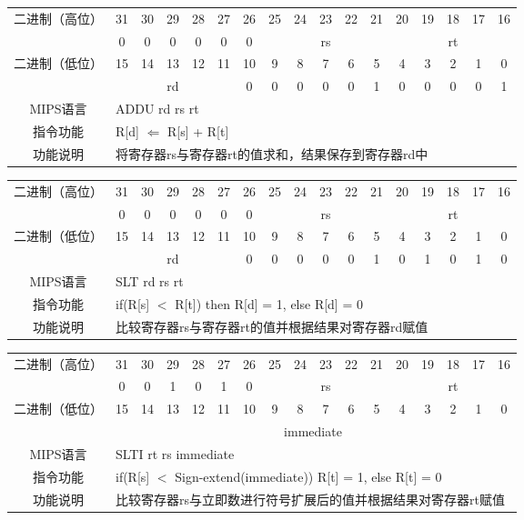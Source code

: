 \begin{table}

\begin{tabular}{|c|c|c|c|c|c|c|c|c|c|c|c|c|c|c|c|c|}
\hline
\multirow{2}{*}{二进制（高位）} &
31&30&29&28&27&26&25&24&23&22&21&20&19&18&17&16\\
\cline{2-17}
&0&0&0&0&0&0&
\multicolumn{5}{c|}{rs}&
\multicolumn{5}{c|}{rt}\\
\hline
\multirow{2}{*}{二进制（低位）} &
15&14&13&12&11&10&9&8&7&6&5&4&3&2&1&0\\
\cline{2-17}
&
\multicolumn{5}{c|}{rd}&
0&0&0&0&0&1&0&0&0&0&1\\
\hline
MIPS语言&
\multicolumn{16}{l|}{ADDU rd rs rt}\\
\hline
指令功能&
\multicolumn{16}{l|}{R[d] $\Leftarrow$ R[s] + R[t]}\\
\hline
功能说明&
\multicolumn{16}{l|}{将寄存器rs与寄存器rt的值求和，结果保存到寄存器rd中}\\
\hline
\end{tabular}
\end{table}
\begin{table}
\begin{tabular}{|c|c|c|c|c|c|c|c|c|c|c|c|c|c|c|c|c|}
\hline
\multirow{2}{*}{二进制（高位）} &
31&30&29&28&27&26&25&24&23&22&21&20&19&18&17&16\\
\cline{2-17}
&0&0&0&0&0&0&
\multicolumn{5}{c|}{rs}&
\multicolumn{5}{c|}{rt}\\
\hline
\multirow{2}{*}{二进制（低位）} &
15&14&13&12&11&10&9&8&7&6&5&4&3&2&1&0\\
\cline{2-17}
&
\multicolumn{5}{c|}{rd}&
0&0&0&0&0&1&0&1&0&1&0\\
\hline
MIPS语言&
\multicolumn{16}{l|}{SLT rd rs rt}\\
\hline
指令功能&
\multicolumn{16}{l|}{if(R[s] $<$ R[t]) then R[d] = 1, else R[d] = 0}\\
\hline
功能说明&
\multicolumn{16}{l|}{比较寄存器rs与寄存器rt的值并根据结果对寄存器rd赋值}\\
\hline
\end{tabular}
\end{table}

\begin{table}
\begin{tabular}{|c|c|c|c|c|c|c|c|c|c|c|c|c|c|c|c|c|}
\hline
\multirow{2}{*}{二进制（高位）} &
31&30&29&28&27&26&25&24&23&22&21&20&19&18&17&16\\
\cline{2-17}
&0&0&1&0&1&0&
\multicolumn{5}{c|}{rs}&
\multicolumn{5}{c|}{rt}\\
\hline
\multirow{2}{*}{二进制（低位）} &
15&14&13&12&11&10&9&8&7&6&5&4&3&2&1&0\\
\cline{2-17}
&
\multicolumn{16}{c|}{immediate}\\
\hline
MIPS语言&
\multicolumn{16}{l|}{SLTI rt rs immediate}\\
\hline
指令功能&
\multicolumn{16}{l|}{if(R[s] $<$ Sign-extend(immediate)) R[t] = 1, else R[t] = 0}\\
\hline
功能说明&
\multicolumn{16}{l|}{比较寄存器rs与立即数进行符号扩展后的值并根据结果对寄存器rt赋值}\\
\hline
\end{tabular}
\end{table}

